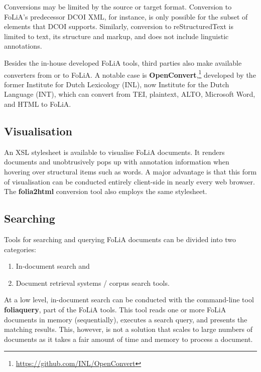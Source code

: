 \documentclass[a4paper,11pt]{article}
\begin{document}
Conversions may be limited by the source or target format. Conversion to
FoLiA's predecessor DCOI XML, for instance, is only possible for the subset of
elements that DCOI supports. Similarly, conversion to
reStructuredText is limited
to text, its structure and markup, and does not include linguistic annotations.

Besides the in-house developed FoLiA tools, third parties also make available
converters from or to FoLiA. A notable case is
\textbf{OpenConvert},\footnote{\url{https://github.com/INL/OpenConvert}}
developed by the former Institute for Dutch Lexicology (INL), now Institute for the Dutch Language (INT), which can convert from TEI, plaintext, ALTO, Microsoft Word, and HTML to FoLiA.

\subsection{Visualisation}

An XSL stylesheet is available to visualise FoLiA documents. It renders
documents and unobtrusively pops up with annotation information when hovering
over structural items such as words. A major advantage is that this form of
visualisation can be conducted entirely client-side in nearly every
web browser. The \textbf{folia2html} conversion tool also employs the same
stylesheet.

\subsection{Searching}

Tools for searching and querying FoLiA documents can be divided into two
categories:

\begin{enumerate}
 \item In-document search and
 \item Document retrieval systems / corpus search tools.
\end{enumerate}

At a low level, in-document search can be conducted with the command-line tool
\textbf{foliaquery}, part of the FoLiA tools. This tool reads one or more FoLiA
documents in memory (sequentially), executes a search query, and presents the
matching results. This, however, is not a solution that scales to large
numbers of documents as it takes a fair amount of time and memory to process a document.
\end{document}
